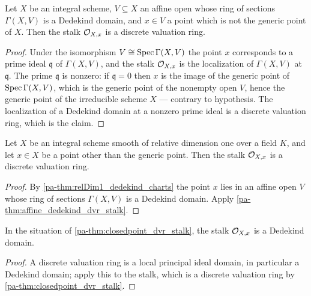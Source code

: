 \begin{theorem}
  \label{pa-thm:affine_dedekind_dvr_stalk}
  \leanok

  Let \(X\) be an integral scheme, \(V \subseteq X\) an affine open whose ring of sections
  \(\Gamma(X, V)\) is a Dedekind domain, and \(x \in V\) a point which is not the generic point
  of \(X\). Then the stalk \(\mathcal{O}_{X,x}\) is a discrete valuation ring.
\end{theorem}
\begin{proof}
  \leanok
  Under the isomorphism \(V \cong \operatorname{Spec} \Gamma(X, V)\) the point \(x\) corresponds to a prime
  ideal \(\mathfrak q\) of \(\Gamma(X, V)\), and the stalk \(\mathcal{O}_{X,x}\) is the localization
  of \(\Gamma(X, V)\) at \(\mathfrak q\). The prime \(\mathfrak q\) is nonzero: if
  \(\mathfrak q = 0\) then \(x\) is the image of the generic point of \(\operatorname{Spec} \Gamma(X, V)\),
  which is the generic point of the nonempty open \(V\), hence the generic point of the
  irreducible scheme \(X\) --- contrary to hypothesis. The localization of a Dedekind domain at
  a nonzero prime ideal is a discrete valuation ring, which is the claim.
\end{proof}

\begin{theorem}
  \label{pa-thm:closedpoint_dvr_stalk}
  \leanok

  Let \(X\) be an integral scheme smooth of relative dimension one over a field \(K\), and let
  \(x \in X\) be a point other than the generic point. Then the stalk \(\mathcal{O}_{X,x}\) is a
  discrete valuation ring.
\end{theorem}
\begin{proof}
  \leanok
  By \ref{pa-thm:relDim1_dedekind_charts} the point \(x\) lies in an affine open \(V\) whose ring
  of sections \(\Gamma(X, V)\) is a Dedekind domain. Apply \ref{pa-thm:affine_dedekind_dvr_stalk}.
\end{proof}

\begin{theorem}
  \label{pa-thm:closedpoint_dedekind_stalk}
  \leanok

  In the situation of \ref{pa-thm:closedpoint_dvr_stalk}, the stalk \(\mathcal{O}_{X,x}\) is a Dedekind
  domain.
\end{theorem}
\begin{proof}
  \leanok
  A discrete valuation ring is a local principal ideal domain, in particular a Dedekind domain;
  apply this to the stalk, which is a discrete valuation ring by \ref{pa-thm:closedpoint_dvr_stalk}.
\end{proof}

